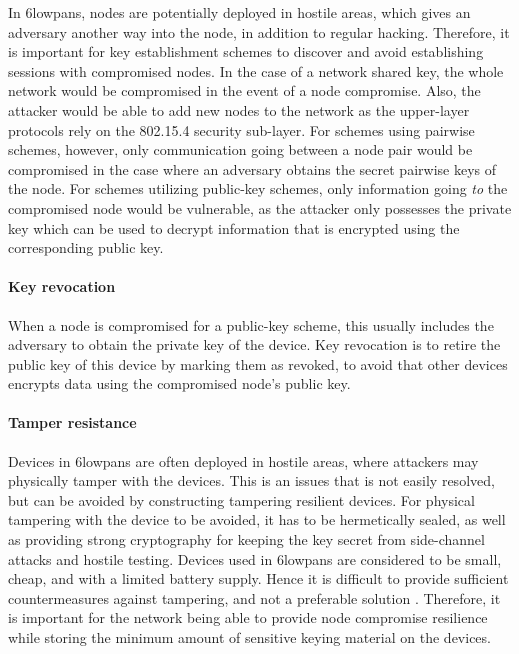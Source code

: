 In \gls{6lowpan}s, nodes are potentially deployed in hostile areas, which gives an adversary another way into the node, in addition to regular hacking. Therefore, it is important for key establishment schemes to discover and avoid establishing sessions with compromised nodes. In the case of a network shared key, the whole network would be compromised in the event of a node compromise. Also, the attacker would be able to add new nodes to the network as the upper-layer protocols rely on the 802.15.4 security sub-layer. For schemes using pairwise schemes, however, only communication going between a node pair would be compromised in the case where an adversary obtains the secret pairwise keys of the node. For schemes utilizing public-key schemes, only information going \emph{to} the compromised node would be vulnerable, as the attacker only possesses the private key which can be used to decrypt information that is encrypted using the corresponding public key.

\paragraph{Key revocation}

When a node is compromised for a public-key scheme, this usually includes the adversary to obtain the private key of the device. Key revocation is to retire the public key of this device by marking them as revoked, to avoid that other devices encrypts data using the compromised node's public key. 

\paragraph{Tamper resistance} Devices in \gls{6lowpan}s are often deployed in hostile areas, where attackers may physically tamper with the devices. This is an issues that is not easily resolved, but can be avoided by constructing tampering resilient devices. For physical tampering with the device to be avoided, it has to be hermetically sealed, as well as providing strong cryptography for keeping the key secret from side-channel attacks and hostile testing. Devices used in \gls{6lowpan}s are considered to be small, cheap, and with a limited battery supply. Hence it is difficult to provide sufficient countermeasures against tampering, and not a preferable solution \cite{anderson1996tamper}. Therefore, it is important for the network being able to provide node compromise resilience while storing the minimum amount of sensitive keying material on the devices.

